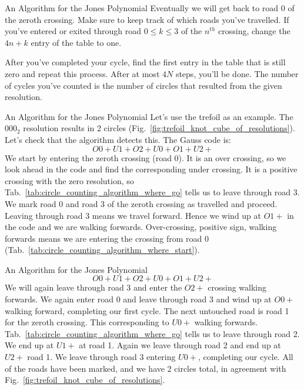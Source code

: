 \documentclass{beamer}
\begin{document}
    \begin{frame}{An Algorithm for the Jones Polynomial}
        Eventually we will get back to road 0 of the zeroth crossing.
        Make sure to keep track of which roads you've travelled. If you've
        entered or exited through road $0\leq{k}\leq{3}$ of the $n^{th}$
        crossing, change the $4n+k$ entry of the table to one.
        \par\hfill\par
        After you've completed your cycle, find the first entry in the table
        that is still zero and repeat this process. After at most $4N$ steps,
        you'll be done. The number of cycles you've counted is the number of
        circles that resulted from the given resolution.
    \end{frame}
    \begin{frame}{An Algorithm for the Jones Polynomial}
        Let's use the trefoil as an example. The $000_{2}$ resolution results
        in 2 circles (Fig.~\ref{fig:trefoil_knot_cube_of_resolutions}). Let's
        check that the algorithm detects this. The Gauss code is:
        \begin{equation}
            O0+U1+O2+U0+O1+U2+
        \end{equation}
        We start by entering the zeroth crossing
        (road 0). It is an over crossing, so we look ahead in the code and
        find the corresponding under crossing. It is a positive crossing with
        the zero resolution, so Tab.~\ref{tab:circle_counting_algorithm_where_go} tells
        us to leave through road 3. We mark road 0 and road 3 of the zeroth
        crossing as travelled and proceed. Leaving through road 3 means we
        travel forward. Hence we wind up at $O1+$ in the code and we are
        walking forwards. Over-crossing, positive sign, walking forwards means
        we are entering the crossing from road 0
        (Tab.~\ref{tab:circle_counting_algorithm_where_start}).
    \end{frame}
    \begin{frame}{An Algorithm for the Jones Polynomial}
        \begin{equation}
            O0+U1+O2+U0+O1+U2+
        \end{equation}
        We will again leave through road 3 and enter the $O2+$ crossing walking
        forwards. We again enter road 0 and leave through road 3 and wind up at
        $O0+$ walking forward, completing our first cycle. The next untouched
        road is road 1 for the zeroth crossing. This corresponding to $U0+$
        walking forwards. Tab.~\ref{tab:circle_counting_algorithm_where_go}
        tells us to leave through road 2. We end up at $U1+$ at road 1. Again
        we leave through road 2 and end up at $U2+$ road 1. We leave through
        road 3 entering $U0+$, completing our cycle. All of the roads have been
        marked, and we have 2 circles total, in agreement with
        Fig.~\ref{fig:trefoil_knot_cube_of_resolutions}.
    \end{frame}
\end{document}
